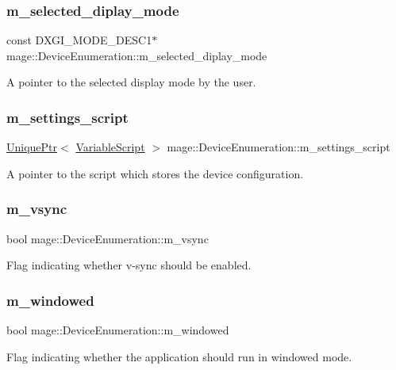 \subsubsection{\texorpdfstring{m\+\_\+selected\+\_\+diplay\+\_\+mode}{m\_selected\_diplay\_mode}}
{\footnotesize\ttfamily const D\+X\+G\+I\+\_\+\+M\+O\+D\+E\+\_\+\+D\+E\+S\+C1$\ast$ mage\+::\+Device\+Enumeration\+::m\+\_\+selected\+\_\+diplay\+\_\+mode\hspace{0.3cm}{\ttfamily [private]}}

A pointer to the selected display mode by the user. \hypertarget{classmage_1_1_device_enumeration_ab6a58580daf27bff07ba7df428833616}{}\label{classmage_1_1_device_enumeration_ab6a58580daf27bff07ba7df428833616} 
\subsubsection{\texorpdfstring{m\+\_\+settings\+\_\+script}{m\_settings\_script}}
{\footnotesize\ttfamily \hyperlink{namespacemage_a8c307fbcc33bce9b7f2aa4c26c3b95cf}{Unique\+Ptr}$<$ \hyperlink{classmage_1_1_variable_script}{Variable\+Script} $>$ mage\+::\+Device\+Enumeration\+::m\+\_\+settings\+\_\+script\hspace{0.3cm}{\ttfamily [private]}}

A pointer to the script which stores the device configuration. \hypertarget{classmage_1_1_device_enumeration_a027220f50649c40785e2b918411adfad}{}\label{classmage_1_1_device_enumeration_a027220f50649c40785e2b918411adfad} 
\subsubsection{\texorpdfstring{m\+\_\+vsync}{m\_vsync}}
{\footnotesize\ttfamily bool mage\+::\+Device\+Enumeration\+::m\+\_\+vsync\hspace{0.3cm}{\ttfamily [private]}}

Flag indicating whether v-\/sync should be enabled. \hypertarget{classmage_1_1_device_enumeration_a277c5dae7861c9cb1175192a61274cc9}{}\label{classmage_1_1_device_enumeration_a277c5dae7861c9cb1175192a61274cc9} 
\subsubsection{\texorpdfstring{m\+\_\+windowed}{m\_windowed}}
{\footnotesize\ttfamily bool mage\+::\+Device\+Enumeration\+::m\+\_\+windowed\hspace{0.3cm}{\ttfamily [private]}}

Flag indicating whether the application should run in windowed mode. 